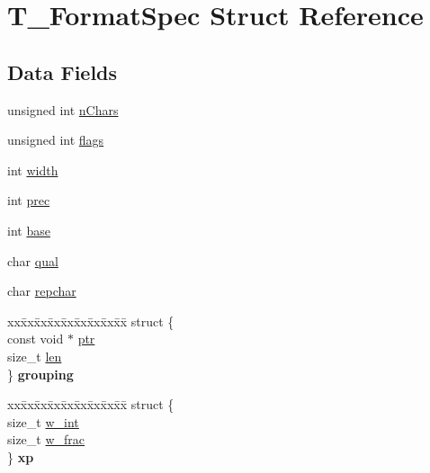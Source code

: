 \hypertarget{struct_t___format_spec}{}\section{T\+\_\+\+Format\+Spec Struct Reference}
\label{struct_t___format_spec}
\subsection*{Data Fields}
\begin{DoxyCompactItemize}
\item 
unsigned int \hyperlink{struct_t___format_spec_a31b304b5fa8417e800e3432a44729cf4}{n\+Chars}
\item 
unsigned int \hyperlink{struct_t___format_spec_ac92588540e8c1d014a08cd8a45462b19}{flags}
\item 
int \hyperlink{struct_t___format_spec_a2474a5474cbff19523a51eb1de01cda4}{width}
\item 
int \hyperlink{struct_t___format_spec_a5bfbd3b409ebe4bc09f9ed58d177c2bd}{prec}
\item 
int \hyperlink{struct_t___format_spec_a19437a5875428e719515fb20de8a6927}{base}
\item 
char \hyperlink{struct_t___format_spec_aeffc1ef2ef6b6e5db808a9c298083522}{qual}
\item 
char \hyperlink{struct_t___format_spec_ab7f528a715d2de5400eb3ab348d3f41e}{repchar}
\item 
\begin{tabbing}
xx\=xx\=xx\=xx\=xx\=xx\=xx\=xx\=xx\=\kill
struct \{\\
\>const void $\ast$ \hyperlink{struct_t___format_spec_ab6679b8a3625461c4f6c523048234022}{ptr}\\
\>size\_t \hyperlink{struct_t___format_spec_a7360b55975153b822efc5217b7734e6a}{len}\\
\} {\bfseries grouping}\hypertarget{struct_t___format_spec_a3ba45078325f7ae91671e762168aa5c2}{}\label{struct_t___format_spec_a3ba45078325f7ae91671e762168aa5c2}
\\

\end{tabbing}\item 
\begin{tabbing}
xx\=xx\=xx\=xx\=xx\=xx\=xx\=xx\=xx\=\kill
struct \{\\
\>size\_t \hyperlink{struct_t___format_spec_ae9d4dc1734b1121e33002ba09d8a3300}{w\_int}\\
\>size\_t \hyperlink{struct_t___format_spec_a4042492d9b6ab3f084980e852d2d7e16}{w\_frac}\\
\} {\bfseries xp}\hypertarget{struct_t___format_spec_aa8e5b9eb1294d7db4625e6493cd03553}{}\label{struct_t___format_spec_aa8e5b9eb1294d7db4625e6493cd03553}
\\

\end{tabbing}\end{DoxyCompactItemize}


